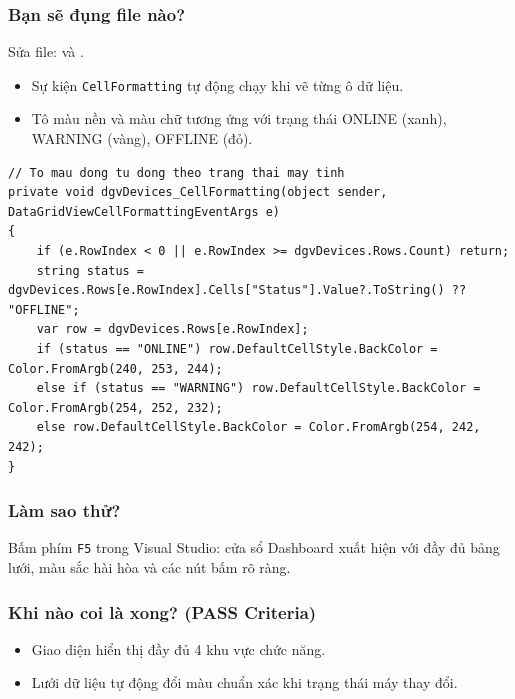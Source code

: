 \documentclass[12pt,a4paper]{article}
\begin{document}
\subsubsection{Bạn sẽ đụng file nào?}
Sửa file:  và .

\begin{orientationbox}
\begin{itemize}[leftmargin=1.5em, itemsep=1pt]
  \item Sự kiện \texttt{CellFormatting} tự động chạy khi vẽ từng ô dữ liệu.
  \item Tô màu nền và màu chữ tương ứng với trạng thái ONLINE (xanh), WARNING (vàng), OFFLINE (đỏ).
\end{itemize}
\end{orientationbox}

\begin{lstlisting}[language=CSharp, caption={Ví dụ rút gọn: Tô màu hàng theo trạng thái trong DataGridView}]
// To mau dong tu dong theo trang thai may tinh
private void dgvDevices_CellFormatting(object sender, DataGridViewCellFormattingEventArgs e)
{
    if (e.RowIndex < 0 || e.RowIndex >= dgvDevices.Rows.Count) return;
    string status = dgvDevices.Rows[e.RowIndex].Cells["Status"].Value?.ToString() ?? "OFFLINE";
    var row = dgvDevices.Rows[e.RowIndex];
    if (status == "ONLINE") row.DefaultCellStyle.BackColor = Color.FromArgb(240, 253, 244);
    else if (status == "WARNING") row.DefaultCellStyle.BackColor = Color.FromArgb(254, 252, 232);
    else row.DefaultCellStyle.BackColor = Color.FromArgb(254, 242, 242);
}
\end{lstlisting}

\subsubsection{Làm sao thử?}
Bấm phím \texttt{F5} trong Visual Studio: cửa sổ Dashboard xuất hiện với đầy đủ bảng lưới, màu sắc hài hòa và các nút bấm rõ ràng.

\subsubsection{Khi nào coi là xong? (PASS Criteria)}
\begin{itemize}
  \item Giao diện hiển thị đầy đủ 4 khu vực chức năng.
  \item Lưới dữ liệu tự động đổi màu chuẩn xác khi trạng thái máy thay đổi.
\end{itemize}
\end{document}
